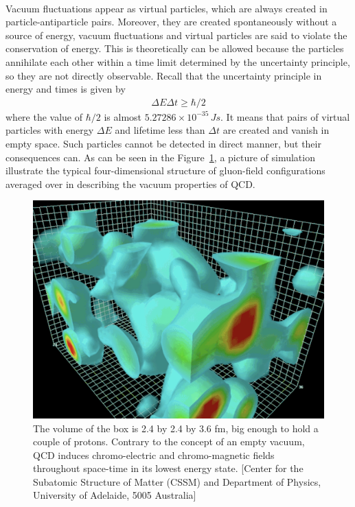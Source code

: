 \documentclass{article}
\begin{document}
        \paragraph{}
        Vacuum fluctuations appear as virtual particles, which are always created in 
        particle-antiparticle pairs. \cite*{virtual-sa} Moreover, they are created spontaneously without a source of 
        energy, vacuum fluctuations and virtual particles are said to violate the conservation of energy.
        This is theoretically can be allowed because the particles annihilate each other within a time limit 
        determined by the uncertainty principle, so they are not directly observable. Recall that the 
        uncertainty principle in energy and times is given by
        \begin{align}
            \Delta{E} \Delta{t} \ge \hbar / 2
        \end{align}
        where the value of $\hbar / 2$ is almost $5.27286 \times 10^{-35}\, Js$. 
        It means that pairs of virtual particles with energy $\Delta{E}$ and lifetime less than 
        $\Delta{t}$ are created and vanish in empty space. Such particles cannot be detected in direct 
        manner, but their consequences can. As can be seen in the Figure~\ref{Fluctuation}, a picture of simulation 
        illustrate the typical four-dimensional structure of gluon-field configurations averaged over in describing the vacuum properties of QCD.

        \begin{figure}
            \includegraphics[width=0.5\linewidth]{fluc.png}
            \centering
            \caption{
                The volume of the box is 2.4 by 2.4 by 3.6 fm, big enough to hold a couple of protons. 
                Contrary to the concept of an empty vacuum, QCD induces chromo-electric and
                chromo-magnetic fields throughout space-time in its lowest energy state.
                [Center for the Subatomic Structure of Matter (CSSM) and Department of Physics, 
                University of Adelaide, 5005 Australia]\cite*{sim}}
            \label{Fluctuation}
        \end{figure}
\end{document}
